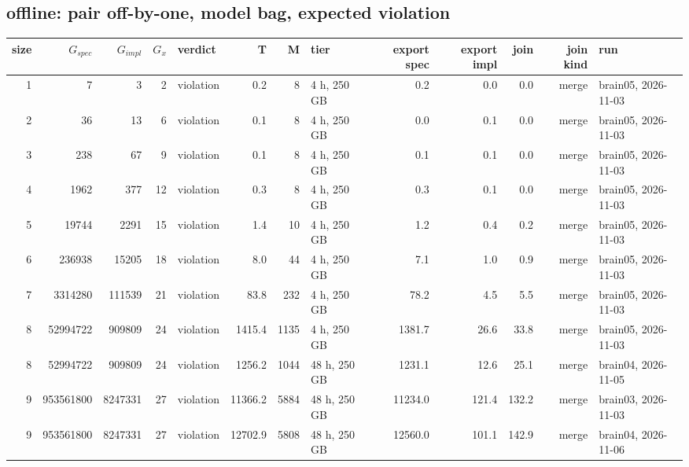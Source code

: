 \documentclass[10pt]{article}
\begin{document}
\subsection*{offline: pair \textsf{off-by-one}, model bag, expected violation}
\begin{longtable}{@{}rrrrlrrlrrrrl@{}}
\toprule
size & $G_{\mathit{spec}}$ & $G_{\mathit{impl}}$ & $G_x$ & verdict & T & M & tier & export spec & export impl & join & join kind & run \\
\midrule
\endhead
\color{blue} 1 & 7 & 3 & 2 & violation & 0.2 & 8 & 4 h, 250 GB & 0.2 & 0.0 & 0.0 & merge & brain05, 2026-11-03 \\
\color{blue} 2 & 36 & 13 & 6 & violation & 0.1 & 8 & 4 h, 250 GB & 0.0 & 0.1 & 0.0 & merge & brain05, 2026-11-03 \\
\color{blue} 3 & 238 & 67 & 9 & violation & 0.1 & 8 & 4 h, 250 GB & 0.1 & 0.1 & 0.0 & merge & brain05, 2026-11-03 \\
\color{blue} 4 & 1962 & 377 & 12 & violation & 0.3 & 8 & 4 h, 250 GB & 0.3 & 0.1 & 0.0 & merge & brain05, 2026-11-03 \\
\color{blue} 5 & 19744 & 2291 & 15 & violation & 1.4 & 10 & 4 h, 250 GB & 1.2 & 0.4 & 0.2 & merge & brain05, 2026-11-03 \\
\color{blue} 6 & 236938 & 15205 & 18 & violation & 8.0 & 44 & 4 h, 250 GB & 7.1 & 1.0 & 0.9 & merge & brain05, 2026-11-03 \\
\color{blue} 7 & 3314280 & 111539 & 21 & violation & 83.8 & 232 & 4 h, 250 GB & 78.2 & 4.5 & 5.5 & merge & brain05, 2026-11-03 \\
\color{blue} 8 & 52994722 & 909809 & 24 & violation & 1415.4 & 1135 & 4 h, 250 GB & 1381.7 & 26.6 & 33.8 & merge & brain05, 2026-11-03 \\
\color{blue} 8 & 52994722 & 909809 & 24 & violation & 1256.2 & 1044 & 48 h, 250 GB & 1231.1 & 12.6 & 25.1 & merge & brain04, 2026-11-05 \\
\color{blue} 9 & 953561800 & 8247331 & 27 & violation & 11366.2 & 5884 & 48 h, 250 GB & 11234.0 & 121.4 & 132.2 & merge & brain03, 2026-11-03 \\
\color{blue} 9 & 953561800 & 8247331 & 27 & violation & 12702.9 & 5808 & 48 h, 250 GB & 12560.0 & 101.1 & 142.9 & merge & brain04, 2026-11-06 \\
\bottomrule
\end{longtable}
\end{document}
